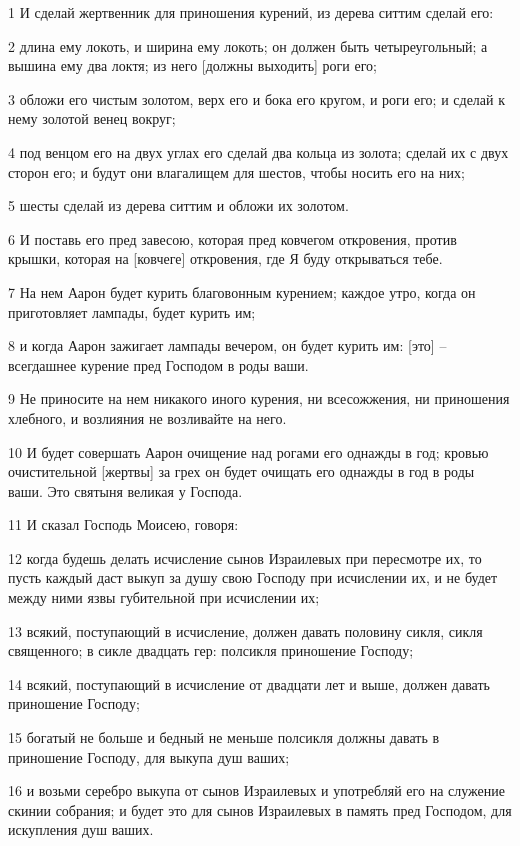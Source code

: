 \par 1 И сделай жертвенник для приношения курений, из дерева ситтим сделай его:
\par 2 длина ему локоть, и ширина ему локоть; он должен быть четыреугольный; а вышина ему два локтя; из него [должны выходить] роги его;
\par 3 обложи его чистым золотом, верх его и бока его кругом, и роги его; и сделай к нему золотой венец вокруг;
\par 4 под венцом его на двух углах его сделай два кольца из золота; сделай их с двух сторон его; и будут они влагалищем для шестов, чтобы носить его на них;
\par 5 шесты сделай из дерева ситтим и обложи их золотом.
\par 6 И поставь его пред завесою, которая пред ковчегом откровения, против крышки, которая на [ковчеге] откровения, где Я буду открываться тебе.
\par 7 На нем Аарон будет курить благовонным курением; каждое утро, когда он приготовляет лампады, будет курить им;
\par 8 и когда Аарон зажигает лампады вечером, он будет курить им: [это] --всегдашнее курение пред Господом в роды ваши.
\par 9 Не приносите на нем никакого иного курения, ни всесожжения, ни приношения хлебного, и возлияния не возливайте на него.
\par 10 И будет совершать Аарон очищение над рогами его однажды в год; кровью очистительной [жертвы] за грех он будет очищать его однажды в год в роды ваши. Это святыня великая у Господа.
\par 11 И сказал Господь Моисею, говоря:
\par 12 когда будешь делать исчисление сынов Израилевых при пересмотре их, то пусть каждый даст выкуп за душу свою Господу при исчислении их, и не будет между ними язвы губительной при исчислении их;
\par 13 всякий, поступающий в исчисление, должен давать половину сикля, сикля священного; в сикле двадцать гер: полсикля приношение Господу;
\par 14 всякий, поступающий в исчисление от двадцати лет и выше, должен давать приношение Господу;
\par 15 богатый не больше и бедный не меньше полсикля должны давать в приношение Господу, для выкупа душ ваших;
\par 16 и возьми серебро выкупа от сынов Израилевых и употребляй его на служение скинии собрания; и будет это для сынов Израилевых в память пред Господом, для искупления душ ваших.
